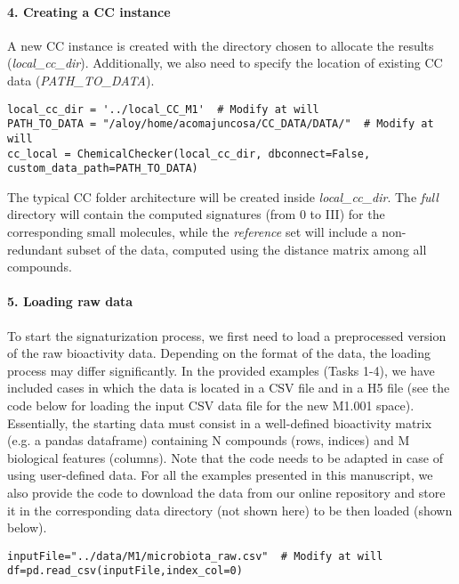 \paragraph{4. Creating a CC instance} \leavevmode

A new CC instance is created with the directory chosen to allocate the results (\textit{local\_cc\_dir}). Additionally, we also need to specify the location of existing CC data (\textit{PATH\_TO\_DATA}). \\

\begin{lstlisting}
local_cc_dir = '../local_CC_M1'  # Modify at will
PATH_TO_DATA = "/aloy/home/acomajuncosa/CC_DATA/DATA/"  # Modify at will
cc_local = ChemicalChecker(local_cc_dir, dbconnect=False, custom_data_path=PATH_TO_DATA)
\end{lstlisting}

The typical CC folder architecture will be created inside \textit{local\_cc\_dir}. The \textit{full} directory will contain the computed signatures (from 0 to III) for the corresponding small molecules, while the \textit{reference} set will include a non-redundant subset of the data, computed using the distance matrix among all compounds.

\paragraph{5. Loading raw data} \leavevmode

To start the signaturization process, we first need to load a preprocessed version of the raw bioactivity data. Depending on the format of the data, the loading process may differ significantly. In the provided examples (Tasks 1-4), we have included cases in which the data is located in a CSV file and in a H5 file (see the code below for loading the input CSV data file for the new M1.001 space). Essentially, the starting data must consist in a well-defined bioactivity matrix (e.g. a pandas dataframe) containing N compounds (rows, indices) and M biological features (columns). Note that the code needs to be adapted in case of using user-defined data. For all the examples presented in this manuscript, we also provide the code to download the data from our online repository and store it in the corresponding data directory (not shown here) to be then loaded (shown below). \\ 

\begin{lstlisting}
inputFile="../data/M1/microbiota_raw.csv"  # Modify at will
df=pd.read_csv(inputFile,index_col=0)
\end{lstlisting} 


